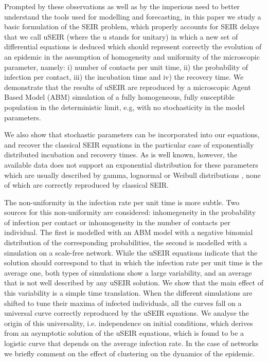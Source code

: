 \documentclass[a4paper,oneside,11pt]{article}
\begin{document}
Prompted by these observations as well as by the imperious need to better understand the tools used for modelling and forecasting, in this paper we study a basic formulation of the SEIR problem, which properly accounts for SEIR delays that we call uSEIR (where the u stands for unitary) in which a new set of differential equations is deduced which should represent correctly the evolution of an epidemic in the assumption of homogeneity and uniformity of the microscopic parameter, namely: i) number of contacts per unit time, ii) the probability of infection per contact, iii) the incubation time and iv) the recovery time. We demonstrate that the results of uSEIR are reproduced by a microscopic Agent Based Model (ABM) simulation of a fully homogeneous, fully susceptible population in the deterministic limit, e.g, with no stochasticity in the model parameters.

We also show that stochastic parameters can be incorporated into our equations, and recover the classical SEIR equations in the particular case of exponentially distributed incubation and recovery times. As is well known, however, the available data does not support an exponential distribution for these parameters which are usually described by gamma, lognormal or Weibull distributions \cite{Zhang2020, Hellewell2020}, none of which are correctly reproduced by classical SEIR.

The non-uniformity in the infection rate per unit time is more subtle. Two sources  for this non-uniformity are considered: inhomegeneity in the probability of infection per contact or inhomogeneity in the number of contacts per individual. The first is modelled with an ABM model with a negative binomial distribution of the corresponding probabilities, the second is modelled with a simulation on a scale-free network. While the uSEIR equations indicate that the solution should correspond to that in which the infection rate per unit time is the average one, both types of simulations show a large variability, and an average that is not well described by any uSEIR solution. We show that the main effect of this variability is a simple time translation. When the different simulations are shifted to tune their maxima of infected individuals, all the curves fall on a universal curve correctly reproduced by the uSEIR equations. We analyse the origin of this universality, i.e. independence on initial conditions, which derives from an asymptotic solution of the uSEIR equations, which is found to be a logistic curve that depends on the average infection rate. In the case of networks we briefly comment on the effect of clustering on the dynamics of the epidemic. 
\end{document}
